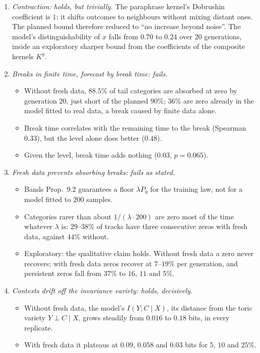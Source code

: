 \documentclass[11pt]{article}
\theoremstyle{definition}
\theoremstyle{remark}
\begin{document}
\begin{enumerate}[leftmargin=*]
\item \emph{Contraction: holds, but trivially.} The paraphrase kernel's Dobrushin coefficient is $1$: it shifts outcomes to neighbours
  without mixing distant ones. The planned bound therefore reduced to ``no increase beyond noise''. The model's distinguishability of
  $x$ falls from $0.70$ to $0.24$ over $20$ generations, inside an exploratory sharper bound from the coefficients of the composite
  kernels $K^g$.
\item \emph{Breaks in finite time, forecast by break time: fails.}
  \begin{itemize}[nosep]
  \item Without fresh data, $88.5\%$ of tail categories are absorbed at zero by generation $20$, just short of the planned $90\%$; $36\%$
    are zero already in the model fitted to real data, a break caused by finite data alone.
  \item Break time correlates with the remaining time to the break (Spearman $0.33$), but the level alone does better ($0.48$).
  \item Given the level, break time adds nothing ($0.03$, $p=0.065$).
  \end{itemize}
\item \emph{Fresh data prevents absorbing breaks: fails as stated.}
  \begin{itemize}[nosep]
  \item Bands Prop.~9.2 guarantees a floor $\lambda P_0$ for the training law, not for a model fitted to $200$ samples.
  \item Categories rarer than about $1/(\lambda\cdot200)$ are zero most of the time whatever $\lambda$ is: $29$--$38\%$ of tracks have
    three consecutive zeros with fresh data, against $44\%$ without.
  \item Exploratory: the qualitative claim holds. Without fresh data a zero never recovers; with fresh data zeros recover at $7$--$19\%$
    per generation, and persistent zeros fall from $37\%$ to $16$, $11$ and $5\%$.
  \end{itemize}
\item \emph{Contexts drift off the invariance variety: holds, decisively.}
  \begin{itemize}[nosep]
  \item Without fresh data, the model's $I(Y;C\mid X)$, its distance from the toric variety $Y\perp C\mid X$, grows steadily from
    $0.016$ to $0.18$ bits, in every replicate.
  \item With fresh data it plateaus at $0.09$, $0.058$ and $0.03$ bits for $5$, $10$ and $25\%$.

\end{itemize}
\end{enumerate}
\end{document}

